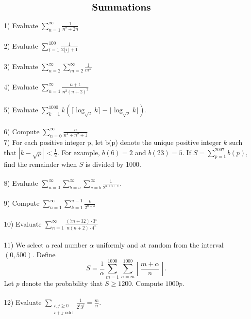 \documentclass{article}
\begin{document}
$\centerline{\Large \textbf{Summations}}$
\\
\\
1) Evaluate $\displaystyle\sum_{n=1}^{\infty}\frac{1}{n^2+2n}$
\\
\\
2) Evaluate $\displaystyle\sum_{i=1}^{100} \frac{1}{2 \lfloor i \rfloor + 1}$
\\
\\
3) Evaluate $\displaystyle\sum_{n=2}^{\infty}\displaystyle\sum_{m=2}^{\infty}\frac{1}{m^n}$
\\
\\
4) Evaluate $\displaystyle\sum_{n=1}^{\infty} \frac{n+1}{n^2(n+2)^2}$
\\
\\
5) Evaluate $ \displaystyle\sum_{k=1}^{1000}k(\lceil\log_{\sqrt{2}}k\rceil-\lfloor\log_{\sqrt{2}}k\rfloor). $
\\
\\
6) Compute $\displaystyle\sum_{n=0}^{\infty}\frac{n}{n^4+n^2+1}$
\\
7) For each positive integer p, let b(p) denote the unique positive integer $k$ such that $|k-\sqrt{p}|<\frac{1}{2}$. For example, $b(6) = 2$ and $b(23)=5$. If $S = \displaystyle\sum_{p=1}^{2007}b(p)$, find the remainder when $S$ is divided by 1000.
\\
\\
8) Evaluate $\displaystyle\sum_{a = 0}^{\infty}\sum_{b=a}^{\infty}\sum_{c=b}^{\infty} \frac{1}{2^{a+b+c}}$.
\\
\\
9) Compute $\displaystyle\sum_{n=1}^{\infty}\displaystyle\sum_{k=1}^{n-1}\displaystyle\frac{k}{2^{n+k}}$
\\
\\
10) Evaluate $\displaystyle\sum_{n=1}^{\infty} \frac{(7n+32)\cdot3^n}{n(n+2)\cdot 4^n}$
\\
\\
11) We select a real number $\alpha$ uniformly and at random from the interval $(0,500)$. Define 
\begin{equation*}
S = \frac{1}{\alpha} \sum_{m=1}^{1000} \sum_{n=m}^{1000} \left\lfloor \frac{m+\alpha}{n} \right\rfloor.
\end{equation*}
Let $p$ denote the probability that $S \ge 1200$. Compute $1000p$.
\\
\\
12) Evaluate $\displaystyle\sum_{\substack{i,j \ge 0 \\ i+j \text{ odd}}} \frac{1}{2^i3^j} = \frac{m}{n}.$
\\
\\
\end{document}
